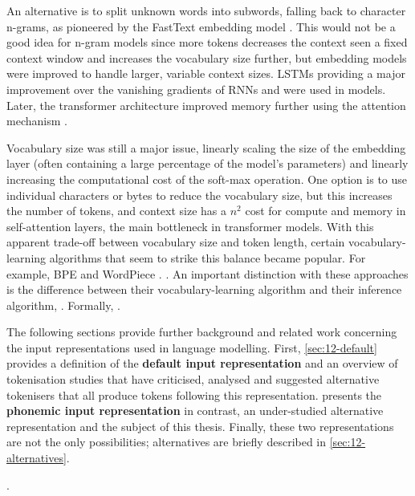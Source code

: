 An alternative is to split unknown words into subwords, falling back to character n-grams, as pioneered by the FastText embedding model \addcites. This would not be a good idea for n-gram models since more tokens decreases the context seen a fixed context window and increases the vocabulary size further, but embedding models were improved to handle larger, variable context sizes. LSTMs providing a major improvement over the vanishing gradients of RNNs and were used in \writemore models. Later, the transformer architecture improved memory further using the attention mechanism \addcites.

Vocabulary size was still a major issue, linearly scaling the size of the embedding layer (often containing a large percentage of the model's parameters) and linearly increasing the computational cost of the soft-max operation. One option is to use individual characters or bytes to reduce the vocabulary size, but this increases the number of tokens, and context size has a $n^2$ cost for compute and memory in self-attention layers, the main bottleneck in transformer models. With this apparent trade-off between vocabulary size and token length, certain vocabulary-learning algorithms that seem to strike this balance became popular. For example, BPE and WordPiece \addcites. \writemore. An important distinction with these approaches is the difference between their vocabulary-learning algorithm and their inference algorithm, \writemore. Formally, \writemore. 


The following sections provide further background and related work concerning the input representations used in language modelling. First, \cref{sec:12-default} provides a definition of the \textbf{default input representation} and an overview of tokenisation studies that have criticised, analysed and suggested alternative tokenisers that all produce tokens following this representation.  presents the \textbf{phonemic input representation} in contrast, an under-studied alternative representation and the subject of this thesis. Finally, these two representations are not the only possibilities; alternatives are briefly described in \cref{sec:12-alternatives}.

. 

